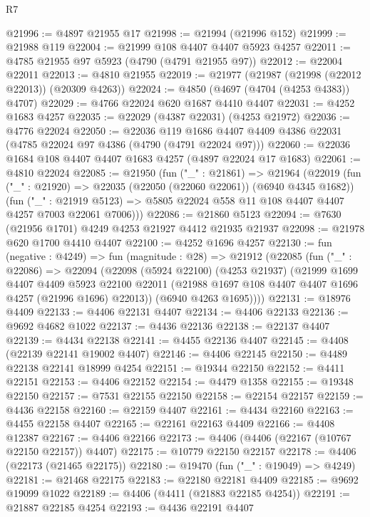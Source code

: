 \begin{lexlean}{R7}
\begin{coremodule}
@21996 := @4897 @21955 @17
@21998 := @21994 (@21996 @152)
@21999 := @21988 @119
@22004 := @21999 @108 @4407 @4407 @5923 @4257
@22011 := @4785 @21955 @97 @5923 (@4790 (@4791 @21955 @97))
@22012 := @22004 @22011
@22013 := @4810 @21955
@22019 := @21977 (@21987 (@21998 (@22012 @22013)) (@20309 @4263))
@22024 := @4850 (@4697 (@4704 (@4253 @4383)) @4707)
@22029 := @4766 @22024 @620 @1687 @4410 @4407
@22031 := @4252 @1683 @4257
@22035 := @22029 (@4387 @22031) (@4253 @21972)
@22036 := @4776 @22024
@22050 := @22036
    @119
    @1686
    @4407
    @4409
    @4386
    @22031
    (@4785 @22024 @97 @4386 (@4790 (@4791 @22024 @97)))
@22060 := @22036 @1684 @108 @4407 @4407 @1683 @4257 (@4897 @22024 @17 @1683)
@22061 := @4810 @22024
@22085 := @21950
    (fun ("_" : @21861) =>
    @21964
      (@22019
        (fun ("_" : @21920) => @22035 (@22050 (@22060 @22061)) (@6940 @4345 @1682))
        (fun ("_" : @21919 @5123) =>
        @5805 @22024 @558 @11 @108 @4407 @4407 @4257 @7003 @22061 @7006)))
@22086 := @21860 @5123
@22094 := @7630 (@21956 @1701) @4249 @4253 @21927 @4412 @21935 @21937
@22098 := @21978 @620 @1700 @4410 @4407
@22100 := @4252 @1696 @4257
@22130 := fun (negative : @4249) =>
  fun (magnitude : @28) =>
  @21912
    (@22085
      (fun ("_" : @22086) =>
      @22094
        (@22098
          (@5924 @22100)
          (@4253 @21937)
          (@21999
            @1699
            @4407
            @4409
            @5923
            @22100
            @22011
            (@21988 @1697 @108 @4407 @4407 @1696 @4257 (@21996 @1696) @22013))
          (@6940 @4263 @1695))))
@22131 := @18976 @4409
@22133 := @4406 @22131 @4407
@22134 := @4406 @22133
@22136 := @9692 @4682 @1022
@22137 := @4436 @22136
@22138 := @22137 @4407
@22139 := @4434 @22138
@22141 := @4455 @22136 @4407
@22145 := @4408 (@22139 @22141 @19002 @4407)
@22146 := @4406 @22145
@22150 := @4489 @22138 @22141 @18999 @4254
@22151 := @19344 @22150
@22152 := @4411 @22151
@22153 := @4406 @22152
@22154 := @4479 @1358
@22155 := @19348 @22150
@22157 := @7531 @22155 @22150
@22158 := @22154 @22157
@22159 := @4436 @22158
@22160 := @22159 @4407
@22161 := @4434 @22160
@22163 := @4455 @22158 @4407
@22165 := @22161 @22163 @4409
@22166 := @4408 @12387
@22167 := @4406 @22166
@22173 := @4406 (@4406 (@22167 (@10767 @22150 @22157)) @4407)
@22175 := @10779 @22150 @22157
@22178 := @4406 (@22173 (@21465 @22175))
@22180 := @19470 (fun ("_" : @19049) => @4249)
@22181 := @21468 @22175
@22183 := @22180 @22181 @4409
@22185 := @9692 @19099 @1022
@22189 := @4406 (@4411 (@21883 @22185 @4254))
@22191 := @21887 @22185 @4254
@22193 := @4436 @22191 @4407

\end{coremodule}
\end{lexlean}
